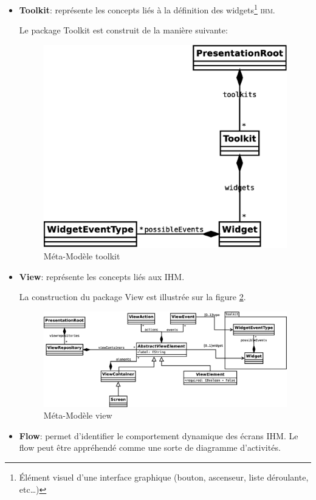 \begin{itemize}
  \item \textbf{Toolkit}: représente les concepts liés à la définition des widgets\footnote{Élément visuel d'une interface graphique (bouton, ascenseur, liste déroulante, etc\dots)} \textsc{ihm}.

Le package Toolkit est construit de la manière suivante:

\begin{figure}[htb]
  \centering
  \includegraphics[scale=.3]{img/toolkit.eps}
  \caption{Méta-Modèle toolkit}
  \label{fig:toolkit}
\end{figure}
  \item \textbf{View}: représente les concepts liés aux  \textsc{IHM}.

La construction du package View est illustrée sur la figure \ref{fig:view}.
\begin{figure}[h]
  \centering
  \includegraphics[scale=.3]{img/view.eps}
  \caption{Méta-Modèle view}
  \label{fig:view}
\end{figure}
  \item \textbf{Flow}: permet d'identifier le comportement dynamique des écrans \textsc{IHM}. Le flow peut être appréhendé comme une sorte de diagramme d'activités.


\end{itemize}
